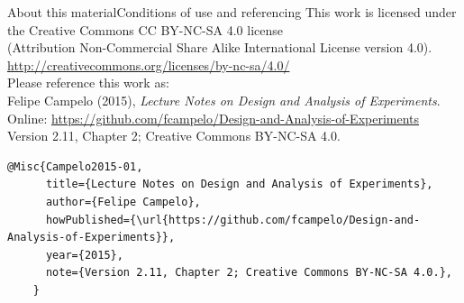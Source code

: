 \documentclass[t]{beamer}
\begin{document}

\begin{ftstf}{About this material}{Conditions of use and referencing}
\centering\footnotesize This work is licensed under the Creative Commons CC BY-NC-SA 4.0 license\\(Attribution Non-Commercial Share Alike International License version 4.0).\\
\vhalf
\url{http://creativecommons.org/licenses/by-nc-sa/4.0/}\\
\vone
\footnotesize Please reference this work as:\\
\footnotesize \flushleft Felipe Campelo (2015), \textit{Lecture Notes on Design and Analysis of Experiments}.\\Online: {\scriptsize\url{https://github.com/fcampelo/Design-and-Analysis-of-Experiments}}\\
Version 2.11, Chapter 2; Creative Commons BY-NC-SA 4.0.\\

\begin{Verbatim}[fontsize=\tiny]
    @Misc{Campelo2015-01,
      title={Lecture Notes on Design and Analysis of Experiments},
      author={Felipe Campelo},
      howPublished={\url{https://github.com/fcampelo/Design-and-Analysis-of-Experiments}},
      year={2015},
      note={Version 2.11, Chapter 2; Creative Commons BY-NC-SA 4.0.},
    }
\end{Verbatim}

\end{ftstf}
\end{document}
